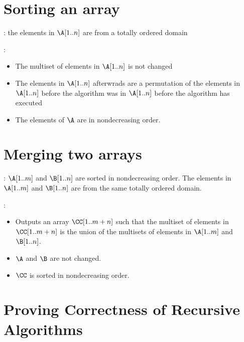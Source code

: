 \documentclass[11pt, cyan, night, 1in]{hw}
\begin{document}

\section{Sorting an array}

\Precondition: the elements in $\A[1..n]$ are from a totally ordered domain

\Postcondition: 

\begin{itemize}
    \item The multiset of elements in $\A[1..n]$ is not changed
    \item The elements in $\A[1..n]$ afterwrads are a permutation of the elements in $\A[1..n]$ before the algorithm was in $\A[1..n]$ before the algorithm has executed 
    \item The elements of $\A$ are in nondecreasing order.  
\end{itemize}

\section{Merging two arrays}

\Precondition: $\A[1..m]$ and $\B[1..n]$ are sorted in nondecreasing order. The elements in $\A[1..m]$ and $\B[1..n]$ are from the same totally ordered domain.

\Postcondition: 
\begin{itemize}
    \item Outputs an array $\CC[1..m+n]$ such that the multiset of elements in $\CC[1..m+n]$ is the union of the multisets of elements in $\A[1..m]$ and $\B[1..n]$.
    \item $\A$ and $\B$ are not changed. 
    \item $\CC$ is sorted in nondecreasing order. 
\end{itemize} 

\section{Proving Correctness of Recursive Algorithms}
\end{document}
